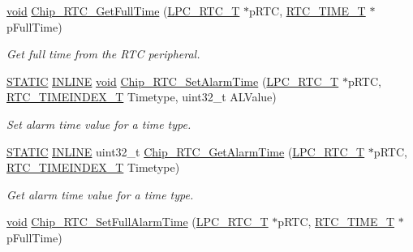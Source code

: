\begin{DoxyCompactItemize}
\hyperlink{Paradigm_2Tern__EE_2small_2portmacro_8h_a14d32f8130d3c0b212cfc751730b5b49}{void} \hyperlink{group__RTC__17XX__40XX_gab03d971e0b77ba907f414cdc00acce3b}{Chip\-\_\-\-R\-T\-C\-\_\-\-Get\-Full\-Time} (\hyperlink{structLPC__RTC__T}{L\-P\-C\-\_\-\-R\-T\-C\-\_\-\-T} $\ast$p\-R\-T\-C, \hyperlink{structRTC__TIME__T}{R\-T\-C\-\_\-\-T\-I\-M\-E\-\_\-\-T} $\ast$p\-Full\-Time)
\begin{DoxyCompactList}\small\item\em Get full time from the R\-T\-C peripheral. \end{DoxyCompactList}\item 
\hyperlink{group__LPC__Types__Public__Macros_ga10b2d890d871e1489bb02b7e70d9bdfb}{S\-T\-A\-T\-I\-C} \hyperlink{group__LPC__Types__Public__Types_ga2eb6f9e0395b47b8d5e3eeae4fe0c116}{I\-N\-L\-I\-N\-E} \hyperlink{Paradigm_2Tern__EE_2small_2portmacro_8h_a14d32f8130d3c0b212cfc751730b5b49}{void} \hyperlink{group__RTC__17XX__40XX_ga7ac6a9a813f710e8e93c4b598a14a795}{Chip\-\_\-\-R\-T\-C\-\_\-\-Set\-Alarm\-Time} (\hyperlink{structLPC__RTC__T}{L\-P\-C\-\_\-\-R\-T\-C\-\_\-\-T} $\ast$p\-R\-T\-C, \hyperlink{group__RTC__17XX__40XX_ga8144898fe628404d396db06dc8aac0e0}{R\-T\-C\-\_\-\-T\-I\-M\-E\-I\-N\-D\-E\-X\-\_\-\-T} Timetype, uint32\-\_\-t A\-L\-Value)
\begin{DoxyCompactList}\small\item\em Set alarm time value for a time type. \end{DoxyCompactList}\item 
\hyperlink{group__LPC__Types__Public__Macros_ga10b2d890d871e1489bb02b7e70d9bdfb}{S\-T\-A\-T\-I\-C} \hyperlink{group__LPC__Types__Public__Types_ga2eb6f9e0395b47b8d5e3eeae4fe0c116}{I\-N\-L\-I\-N\-E} uint32\-\_\-t \hyperlink{group__RTC__17XX__40XX_gaf094ef7c4ff7295c74be8ab77e39a967}{Chip\-\_\-\-R\-T\-C\-\_\-\-Get\-Alarm\-Time} (\hyperlink{structLPC__RTC__T}{L\-P\-C\-\_\-\-R\-T\-C\-\_\-\-T} $\ast$p\-R\-T\-C, \hyperlink{group__RTC__17XX__40XX_ga8144898fe628404d396db06dc8aac0e0}{R\-T\-C\-\_\-\-T\-I\-M\-E\-I\-N\-D\-E\-X\-\_\-\-T} Timetype)
\begin{DoxyCompactList}\small\item\em Get alarm time value for a time type. \end{DoxyCompactList}\item 
\hyperlink{Paradigm_2Tern__EE_2small_2portmacro_8h_a14d32f8130d3c0b212cfc751730b5b49}{void} \hyperlink{group__RTC__17XX__40XX_ga7ad6b4d1d2aaaf093ddde0cef9023ba0}{Chip\-\_\-\-R\-T\-C\-\_\-\-Set\-Full\-Alarm\-Time} (\hyperlink{structLPC__RTC__T}{L\-P\-C\-\_\-\-R\-T\-C\-\_\-\-T} $\ast$p\-R\-T\-C, \hyperlink{structRTC__TIME__T}{R\-T\-C\-\_\-\-T\-I\-M\-E\-\_\-\-T} $\ast$p\-Full\-Time)

\end{DoxyCompactItemize}
